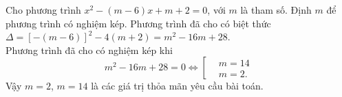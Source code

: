 \begin{bt}%
 Cho phương trình $x^2-(m-6)x+m+2=0$, với $m$ là tham số. Định $m$ để phương trình có nghiệm kép.
 \loigiai
  {
   Phương trình đã cho có biệt thức $\Delta =\left[-(m-6)\right]^2-4(m+2)=m^2-16m+28$.\\
   Phương trình đã cho có nghiệm kép khi
   \allowdisplaybreaks
   \begin{equation*}
    m^2-16m+28=0 \Leftrightarrow \left[\begin{aligned}&m=14 \\&m=2.\end{aligned}\right.
   \end{equation*}
   Vậy $m=2$, $m=14$ là các giá trị thỏa mãn yêu cầu bài toán.
  }
\end{bt}

